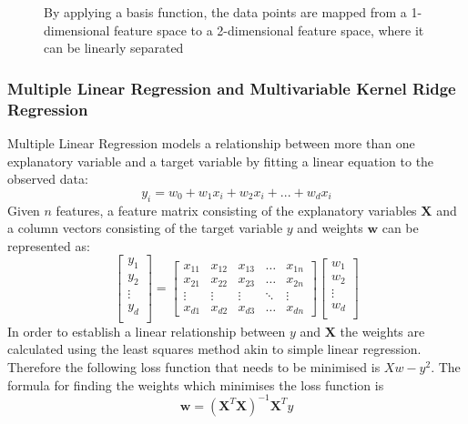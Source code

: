 \documentclass[a4paper,11pt,twoside]{article}
\begin{document}
      \begin{figure}[!htb]
      \captionsetup{justification=centering}
        \caption{\label{fig:my-label}By applying a basis function, the data points are mapped from a 1-dimensional feature space to a 2-dimensional feature space, where it can be linearly separated}
      \end{figure}

\subsubsection{Multiple Linear Regression and Multivariable Kernel Ridge Regression}
Multiple Linear Regression models a relationship between more than one explanatory variable and a target variable by fitting a linear equation to the observed data:
\begin{equation}
y_{i} = w_{0} + w_{1}x_{i} + w_{2}x_{i} +  ... + w_{d}x_{i}
\end{equation}
Given $n$ features, a feature matrix consisting of the explanatory variables $\textbf{X}$ and a column vectors consisting of the target variable $y$ and weights $\textbf{w}$ can be represented as:
\[
\begin{bmatrix}
	y_{1}\\
	y_{2}\\
	\vdots \\
	y_{d} \\
\end{bmatrix}
= \begin{bmatrix}
    x_{11} & x_{12} & x_{13} & \dots  & x_{1n} \\
    x_{21} & x_{22} & x_{23} & \dots  & x_{2n} \\
    \vdots & \vdots & \vdots & \ddots & \vdots \\
    x_{d1} & x_{d2} & x_{d3} & \dots  & x_{dn}
\end{bmatrix}
\begin{bmatrix}
	w_{1}\\
	w_{2}\\
	\vdots \\
	w_{d} \\
\end{bmatrix}
\]
In order to establish a linear relationship between $y$ and $\textbf{X}$ the weights are calculated using the least squares method akin to simple linear regression. Therefore the following loss function that needs to be minimised is $Xw -y^2$. The formula for finding the weights which minimises the loss function is
\begin{equation}
\textbf{w} = (\textbf{X}^T\textbf{X})^{-1}\textbf{X}^Ty
\end{equation}
\end{document}
